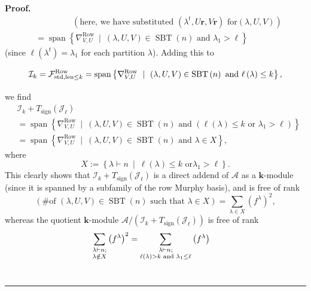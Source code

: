 \documentclass[numbers=enddot,12pt,final,onecolumn,notitlepage]{scrartcl}%
\numberwithin{exer}{subsection}
\theoremstyle{definition}
\newenvironment{proof}[1][Proof]{\noindent\textbf{#1.} }{\ \rule{0.5em}{0.5em}}
\let\sumnonlimits\sum
\renewcommand{\sum}{\sumnonlimits\limits}
\newcommand{\MurpF}{\vphantom{\int_g^g}\mathcal{F}}
\begin{document}
\begin{proof}
\begin{align*}
&  \ \ \ \ \ \ \ \ \ \ \ \ \ \ \ \ \ \ \ \ \left(  \text{here, we have
substituted }\left(  \lambda^{t},U\mathbf{r},V\mathbf{r}\right)  \text{ for
}\left(  \lambda,U,V\right)  \right) \\
&  =\operatorname*{span}\left\{  \nabla_{V,U}^{\operatorname*{Row}}%
\ \mid\ \left(  \lambda,U,V\right)  \in\operatorname*{SBT}\left(  n\right)
\text{ and }\lambda_{1}>\ell\right\}
\end{align*}
(since $\ell\left(  \lambda^{t}\right)  =\lambda_{1}$ for each partition
$\lambda$). Adding this to
\[
\mathcal{I}_{k}=\MurpF_{\operatorname*{std},\operatorname*{len}\leq
k}^{\operatorname*{Row}}=\operatorname*{span}\left\{  \nabla_{V,U}%
^{\operatorname*{Row}}\ \mid\ \left(  \lambda,U,V\right)  \in
\operatorname*{SBT}\left(  n\right)  \text{ and }\ell\left(  \lambda\right)
\leq k\right\}  ,
\]
we find%
\begin{align*}
&  \mathcal{I}_{k}+T_{\operatorname*{sign}}\left(  \mathcal{J}_{\ell}\right)
\\
&  =\operatorname*{span}\left\{  \nabla_{V,U}^{\operatorname*{Row}}%
\ \mid\ \left(  \lambda,U,V\right)  \in\operatorname*{SBT}\left(  n\right)
\text{ and }\left(  \ell\left(  \lambda\right)  \leq k\text{ or }\lambda
_{1}>\ell\right)  \right\} \\
&  =\operatorname*{span}\left\{  \nabla_{V,U}^{\operatorname*{Row}}%
\ \mid\ \left(  \lambda,U,V\right)  \in\operatorname*{SBT}\left(  n\right)
\text{ and }\lambda\in X\right\}  ,
\end{align*}
where
\[
X:=\left\{  \lambda\vdash n\ \mid\ \ell\left(  \lambda\right)  \leq k\text{ or
}\lambda_{1}>\ell\right\}  .
\]
This clearly shows that $\mathcal{I}_{k}+T_{\operatorname*{sign}}\left(
\mathcal{J}_{\ell}\right)  $ is a direct addend of $\mathcal{A}$ as a
$\mathbf{k}$-module (since it is spanned by a subfamily of the row Murphy
basis), and is free of rank
\[
\left(  \text{\# of }\left(  \lambda,U,V\right)  \in\operatorname*{SBT}\left(
n\right)  \text{ such that }\lambda\in X\right)  =\sum_{\lambda\in X}\left(
f^{\lambda}\right)  ^{2},
\]
whereas the quotient $\mathbf{k}$-module $\mathcal{A}/\left(  \mathcal{I}%
_{k}+T_{\operatorname*{sign}}\left(  \mathcal{J}_{\ell}\right)  \right)  $ is
free of rank
\begin{align*}
\sum\limits_{\substack{\lambda\vdash n;\\\lambda\notin X}}\left(  f^{\lambda
}\right)  ^{2}  &  =\sum\limits_{\substack{\lambda\vdash n;\\\ell\left(
\lambda\right)  >k\text{ and }\lambda_{1}\leq\ell}}\left(  f^{\lambda}\right)

\end{align*}
\end{proof}
\end{document}
